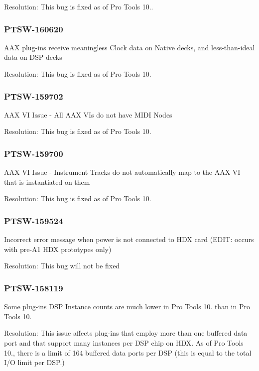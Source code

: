 Resolution\+: This bug is fixed as of Pro Tools 10..\hypertarget{a00374_PTSW-160620}{}\subsubsection{P\+T\+S\+W-\/160620}\label{a00374_PTSW-160620}
A\+A\+X plug-\/ins receive meaningless Clock data on Native decks, and less-\/than-\/ideal data on D\+S\+P decks

Resolution\+: This bug is fixed as of Pro Tools 10.\hypertarget{a00374_PTSW-159702}{}\subsubsection{P\+T\+S\+W-\/159702}\label{a00374_PTSW-159702}
A\+A\+X V\+I Issue -\/ All A\+A\+X V\+Is do not have M\+I\+D\+I Nodes

Resolution\+: This bug is fixed as of Pro Tools 10.\hypertarget{a00374_PTSW-159700}{}\subsubsection{P\+T\+S\+W-\/159700}\label{a00374_PTSW-159700}
A\+A\+X V\+I Issue -\/ Instrument Tracks do not automatically map to the A\+A\+X V\+I that is instantiated on them

Resolution\+: This bug is fixed as of Pro Tools 10.\hypertarget{a00374_PTSW-159524}{}\subsubsection{P\+T\+S\+W-\/159524}\label{a00374_PTSW-159524}
Incorrect error message when power is not connected to H\+D\+X card (E\+D\+I\+T\+: occurs with pre-\/\+A1 H\+D\+X prototypes only)

Resolution\+: This bug will not be fixed\hypertarget{a00374_PTSW-158119}{}\subsubsection{P\+T\+S\+W-\/158119}\label{a00374_PTSW-158119}
Some plug-\/ins\textquotesingle{} D\+S\+P Instance counts are much lower in Pro Tools 10. than in Pro Tools 10.

Resolution\+: This issue affects plug-\/ins that employ more than one buffered data port and that support many instances per D\+S\+P chip on H\+D\+X. As of Pro Tools 10., there is a limit of 164 buffered data ports per D\+S\+P (this is equal to the total I/\+O limit per D\+S\+P.)

